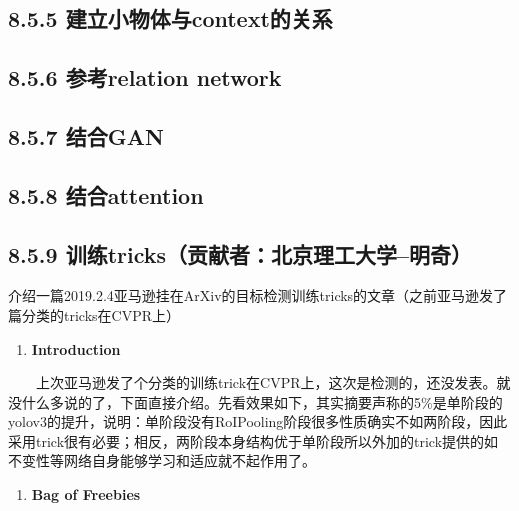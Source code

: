 \subsection{8.5.5
建立小物体与context的关系}\label{ux5efaux7acbux5c0fux7269ux4f53ux4e0econtextux7684ux5173ux7cfb}

\subsection{8.5.6 参考relation
network}\label{ux53c2ux8003relation-network}

\subsection{8.5.7 结合GAN}\label{ux7ed3ux5408gan}

\subsection{8.5.8 结合attention}\label{ux7ed3ux5408attention}

\subsection{8.5.9
训练tricks（贡献者：北京理工大学--明奇）}\label{ux8badux7ec3tricksux8d21ux732eux8005ux5317ux4eacux7406ux5de5ux5927ux5b66ux660eux5947}

介绍一篇2019.2.4亚马逊挂在ArXiv的目标检测训练tricks的文章（之前亚马逊发了篇分类的tricks在CVPR上）

\begin{enumerate}
\def\labelenumi{\arabic{enumi}.}
\item
  \textbf{Introduction}
\end{enumerate}

  上次亚马逊发了个分类的训练trick在CVPR上，这次是检测的，还没发表。就没什么多说的了，下面直接介绍。先看效果如下，其实摘要声称的5\%是单阶段的yolov3的提升，说明：单阶段没有RoIPooling阶段很多性质确实不如两阶段，因此采用trick很有必要；相反，两阶段本身结构优于单阶段所以外加的trick提供的如不变性等网络自身能够学习和适应就不起作用了。

\begin{figure}
\centering
\caption{}
\end{figure}

\begin{enumerate}
\def\labelenumi{\arabic{enumi}.}
\setcounter{enumi}{1}
\item
  \textbf{Bag of Freebies}
\end{enumerate}

